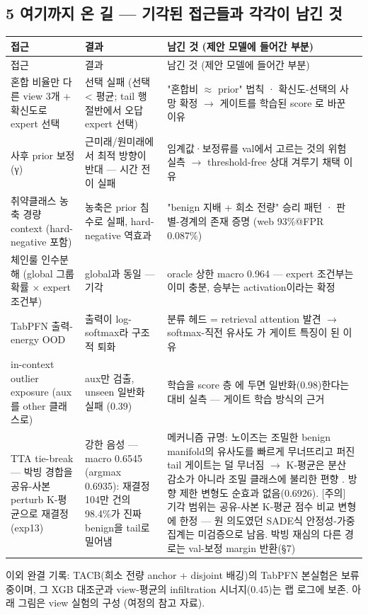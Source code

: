 \subsection*{5 여기까지 온 길 — 기각된 접근들과 각각이 남긴 것}
\begingroup
\footnotesize
\begin{longtable}{>{\raggedright\arraybackslash}p{}>{\raggedright\arraybackslash}p{}>{\raggedright\arraybackslash}p{}}
\toprule
접근 & 결과 & 남긴 것 (제안 모델에 들어간 부분) \\ \midrule
\endfirsthead
접근 & 결과 & 남긴 것 (제안 모델에 들어간 부분) \\ \midrule
\endhead
{}혼합 비율만 다른 view 3개 +\allowbreak{} 확신도로 expert 선택 & 선택 실패 (선택 < 평균; tail 행 절반에서 오답 expert 선택) & "혼합비 \ensuremath{\approx} prior" 법칙 · 확신도-선택의 사망 확정  \ensuremath{\rightarrow}  게이트를 학습된 score 로 바꾼 이유 \\
{}사후 prior 보정 (γ) & 근미래/\allowbreak{}원미래에서 최적 방향이 반대 — 시간 전이 실패 & 임계값·보정류를 val에서 고르는 것의 위험 실측  \ensuremath{\rightarrow}  threshold-free 상대 겨루기 채택 이유 \\
{}취약클래스 농축 경량 context (hard-negative 포함) & 농축은 prior 침수로 실패, hard-negative 역효과 & "benign 지배 +\allowbreak{} 희소 전량" 승리 패턴 · 판별-경계의 존재 증명 (web 93\%@FPR 0.087\%) \\
{}체인룰 인수분해 (global 그룹확률 × expert 조건부) & global과 동일 — 기각 & oracle 상한 macro 0.964 — expert 조건부는 이미 충분, 승부는 activation이라는 확정 \\
{}TabPFN 출력-energy OOD & 출력이 log-softmax라 구조적 퇴화 & 분류 헤드 =\allowbreak{} retrieval attention 발견  \ensuremath{\rightarrow}  softmax-직전 유사도 가 게이트 특징이 된 이유 \\
{}in-context outlier exposure (aux를 other 클래스로) & aux만 검출, unseen 일반화 실패 (0.39) & 학습을 score 층 에 두면 일반화(0.98)한다는 대비 실측 — 게이트 학습 방식의 근거 \\
{}TTA tie-break — 박빙 경합을 공유-사본 perturb K-평균으로 재결정 (exp13) & 강한 음성 — macro 0.6545 (argmax 0.6935): 재결정 104만 건의 98.4\%가 진짜 benign을 tail로 밀어냄 & 메커니즘 규명: 노이즈는 조밀한 benign manifold의 유사도를 빠르게 무너뜨리고 퍼진 tail 게이트는 덜 무너짐  \ensuremath{\rightarrow}  K-평균은 분산 감소가 아니라 조밀 클래스에 불리한 편향 . 방향 제한 변형도 순효과 없음(0.6926). [주의] 기각 범위는 공유-사본 K-평균 점수 비교 변형에 한정 — 원 의도였던 SADE식 안정성-가중 집계는 미검증으로 남음. 박빙 재심의 다른 경로는 val-보정 margin 반환(§7) \\
\bottomrule
\end{longtable}
\endgroup
이외 완결 기록: TACB(희소 전량 anchor +\allowbreak{} disjoint 배깅)의 TabPFN 본실험은 보류 중이며, 그 XGB 대조군과 view-평균의 infiltration 시너지(0.45)는 랩 로그에 보존. 아래 그림은 view 실험의 구성 (여정의 참고 자료).

